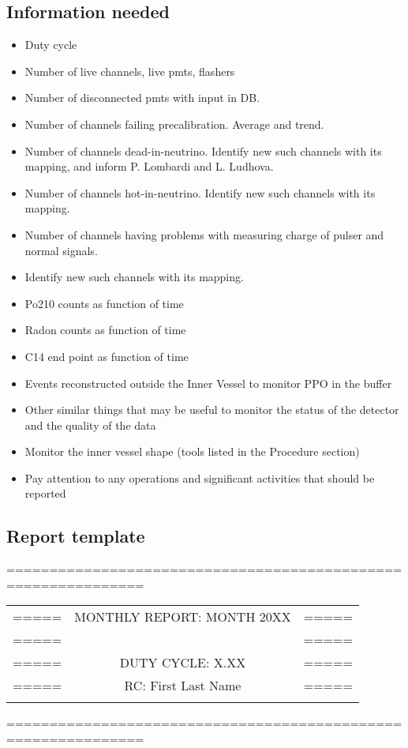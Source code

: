 \documentclass[a4paper,10pt]{article}
\begin{document}
\subsection{Information needed}
\begin{itemize}
 \item Duty cycle
 \item Number of live channels, live pmts, flashers
 \item Number of disconnected pmts with input in DB.
 \item Number of channels failing precalibration. Average and trend.
 \item Number of channels dead-in-neutrino. Identify new such channels with its mapping, and inform P. Lombardi and L. Ludhova.
 \item Number of channels hot-in-neutrino. Identify new such channels with its mapping.
 \item Number of channels having problems with measuring charge of pulser and normal signals.  
 \item Identify new such channels with its mapping.
 \item Po210 counts as function of time
 \item Radon counts as function of time
 \item C14 end point as function of time
 \item Events reconstructed outside the Inner Vessel to monitor PPO in the buffer
 \item Other similar things that may be useful to monitor the status of the detector and the quality of the data
 \item Monitor the inner vessel shape (tools listed in the Procedure section)
 \item Pay attention to any operations and significant activities that should be reported 

\end{itemize}


\newpage

\subsection{Report template}

============================================================== \\

\begin{center}
\begin{tabular}{ l c r }
===== & MONTHLY REPORT: MONTH 20XX & ===== \\
===== &  & ===== \\
===== & DUTY CYCLE: X.XX & ===== \\
===== & RC: First Last Name & ===== \\ \\
\end{tabular}
\end{center}
============================================================== 
\end{document}
